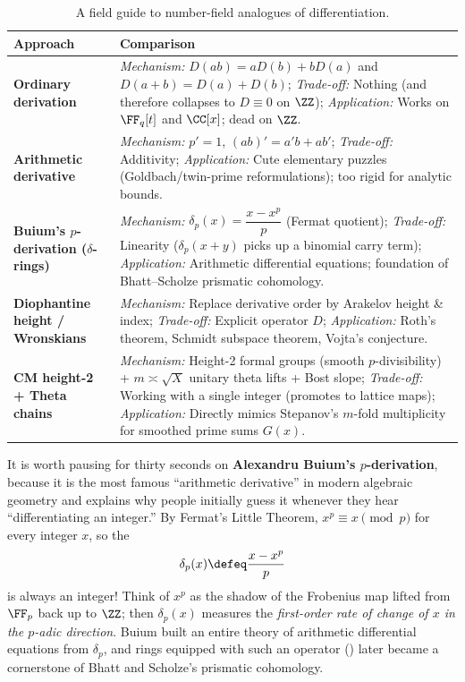 \begingroup
\setlength{\intextsep}{6pt plus 2pt minus 2pt}
\begin{table}[H]
\centering
\small
\setlength{\tabcolsep}{4pt}
\renewcommand{\arraystretch}{1.0}
\begin{tabularx}{\linewidth}{@{}>{\raggedright\arraybackslash}p{.23\linewidth}Y@{}}
\toprule
\textbf{Approach} & \textbf{Comparison} \\
\midrule
\textbf{Ordinary derivation} & \emph{Mechanism:} \(D(ab)=aD(b)+bD(a)\) and \(D(a+b)=D(a)+D(b)\); \emph{Trade-off:} Nothing (and therefore collapses to \(D \equiv 0\) on \(\ZZ\)); \emph{Application:} Works on \(\FF_q[t]\) and \(\CC[x]\); dead on \(\ZZ\). \\
\addlinespace[1pt]
\textbf{Arithmetic derivative} & \emph{Mechanism:} \(p' = 1\), \((ab)' = a'b + ab'\); \emph{Trade-off:} Additivity; \emph{Application:} Cute elementary puzzles (Goldbach/twin-prime reformulations); too rigid for analytic bounds. \\
\addlinespace[1pt]
\textbf{Buium's \(p\)-derivation (\(\delta\)-rings)} & \emph{Mechanism:} \(\delta_p(x) = \dfrac{x - x^p}{p}\) (Fermat quotient); \emph{Trade-off:} Linearity (\(\delta_p(x+y)\) picks up a binomial carry term); \emph{Application:} Arithmetic differential equations; foundation of Bhatt--Scholze prismatic cohomology. \\
\addlinespace[1pt]
\textbf{Diophantine height / Wronskians} & \emph{Mechanism:} Replace derivative order by Arakelov height \& index; \emph{Trade-off:} Explicit operator \(D\); \emph{Application:} Roth's theorem, Schmidt subspace theorem, Vojta's conjecture. \\
\addlinespace[1pt]
\textbf{CM height-2 + Theta chains} & \emph{Mechanism:} Height-2 formal groups (smooth \(p\)-divisibility) + \(m\asymp\sqrt{X}\) unitary theta lifts + Bost slope; \emph{Trade-off:} Working with a single integer (promotes to lattice maps); \emph{Application:} Directly mimics Stepanov's \(m\)-fold multiplicity for smoothed prime sums \(G(x)\). \\
\bottomrule
\end{tabularx}
\caption{A field guide to number-field analogues of differentiation.}
\label{tab:N20261125-derivatives-guide}
\end{table}
\endgroup

It is worth pausing for thirty seconds on \textbf{Alexandru Buium's \(p\)-derivation}, because it is the most famous ``arithmetic derivative'' in modern algebraic geometry and explains why people initially guess it whenever they hear ``differentiating an integer.'' By Fermat's Little Theorem, \(x^p \equiv x \pmod p\) for every integer \(x\), so the 
\[
  \delta_p(x) \defeq \frac{x - x^p}{p}
\]
is always an integer! Think of \(x^p\) as the shadow of the Frobenius map lifted from \(\FF_p\) back up to \(\ZZ\); then \(\delta_p(x)\) measures the \emph{first-order rate of change of \(x\) in the \(p\)-adic direction}. Buium built an entire theory of arithmetic differential equations from \(\delta_p\), and rings equipped with such an operator () later became a cornerstone of Bhatt and Scholze's prismatic cohomology.

